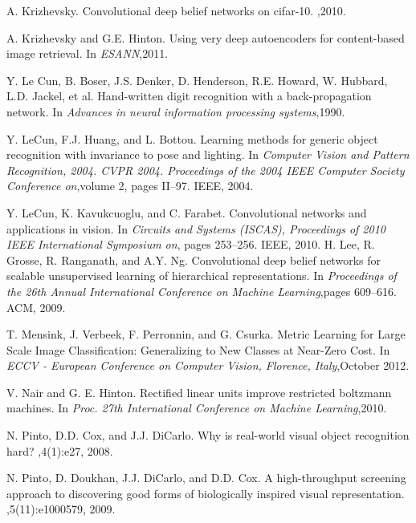 \documentclass[12pt]{article}
\begin{document}
\begin{CJK*}{UTF8}{gkai}
\begin{thebibliography}{1}
A. Krizhevsky.  
\newblock Convolutional deep belief networks on cifar-10. 
,2010.

A. Krizhevsky and G.E. Hinton.  
\newblock Using very deep autoencoders for content-based image retrieval. 
\newblock In {\em ESANN},2011.

Y. Le Cun, B. Boser, J.S. Denker, D. Henderson, R.E. Howard, W. Hubbard, L.D. Jackel, et al.  
\newblock Hand-written digit recognition with a back-propagation network. 
\newblock In {\em Advances in neural information processing systems},1990.

Y. LeCun, F.J. Huang, and L. Bottou.  
\newblock Learning methods for generic object recognition with invariance to pose and lighting.
\newblock In {\em   Computer Vision and Pattern Recognition, 2004. CVPR 2004. Proceedings of the 2004 IEEE Computer Society Conference on},volume 2, pages II–97. IEEE, 2004.

Y. LeCun, K. Kavukcuoglu, and C. Farabet. 
\newblock Convolutional networks and applications in vision. 
\newblock In {\em Circuits and Systems (ISCAS), Proceedings of 2010 IEEE International Symposium on}, pages 253–256. IEEE, 2010. 
H. Lee, R. Grosse, R. Ranganath, and A.Y. Ng.  
\newblock  Convolutional deep belief networks for scalable unsupervised learning of hierarchical representations.  
\newblock In {\em Proceedings of the 26th Annual International Conference on Machine Learning},pages 609–616. ACM, 2009. 

T. Mensink, J. Verbeek, F. Perronnin, and G. Csurka.   
\newblock Metric Learning for Large Scale Image Classification: Generalizing to New Classes at Near-Zero Cost. 
\newblock In {\em  ECCV - European Conference on Computer Vision, Florence, Italy},October 2012.

V. Nair and G. E. Hinton. 
\newblock Rectified linear units improve restricted boltzmann machines.  
\newblock In {\em Proc. 27th International Conference on Machine Learning},2010.

N. Pinto, D.D. Cox, and J.J. DiCarlo.  
\newblock Why is real-world visual object recognition hard?  
,4(1):e27, 2008. 

N. Pinto, D. Doukhan, J.J. DiCarlo, and D.D. Cox.  
\newblock A high-throughput screening approach to discovering good forms of biologically inspired visual representation. 
,5(11):e1000579, 2009. 


\end{thebibliography}
\end{CJK*}
\end{document}
